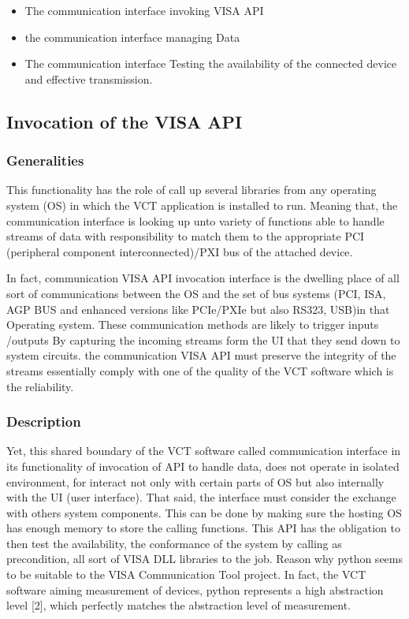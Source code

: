 \documentclass [10pt]{article}
\begin{document}
\begin{itemize}
\item The communication interface invoking VISA API
\item the communication interface managing Data
\item The communication interface Testing the availability of the connected device and effective transmission.
\end{itemize}

\subsection{Invocation of the VISA API}
\subsubsection{Generalities }

This functionality has the role  of call up several libraries from any operating system (OS) in which the VCT application is installed to run. Meaning that, the communication interface is looking up unto variety of functions able to handle streams of data with responsibility to match them to the appropriate PCI (peripheral component interconnected)/PXI bus of the attached device. \par
In fact, communication VISA API invocation interface is the dwelling place of all sort of communications between the OS and the set of bus systems (PCI, ISA, AGP BUS and enhanced versions like PCIe/PXIe but also RS323, USB)in that Operating system. These communication methods are likely to trigger inputs /outputs By capturing the incoming streams form the UI that they send down to system circuits. the communication VISA API must preserve the integrity of the streams essentially comply with one of the quality of the VCT software which is the reliability.

\par\subsubsection{Description}

Yet, this shared boundary of the VCT software called communication interface in its functionality of invocation of API to handle data, does not operate in isolated environment, for interact not only with certain parts of OS but also internally with the UI (user interface). That said, the interface must consider the exchange with others system components. This can be done by making sure the hosting OS has enough memory to store the calling functions. This API has the obligation to then test the availability, the conformance of the system by calling as precondition, all sort of VISA DLL libraries to the job. Reason why python seems to be suitable to the VISA Communication Tool project.
In fact, the VCT software aiming measurement of devices, python represents a high abstraction level [2], which perfectly matches the abstraction level of measurement.
\end{document}
